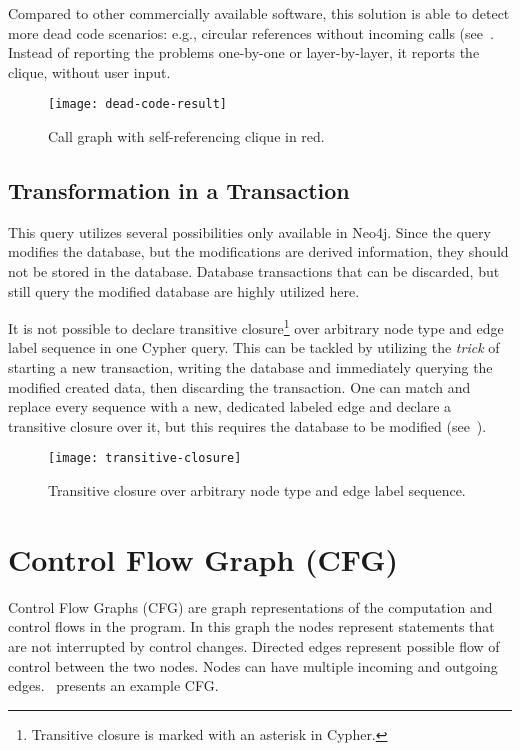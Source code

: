 Compared to other commercially available software, this solution is able to detect more dead code scenarios: e.g., circular references without incoming calls (see~. Instead of reporting the problems one-by-one or layer-by-layer, it reports the clique, without user input.

\begin{figure}[htbp]
  \centering
  \texttt{[image: dead-code-result]}
  \caption{Call graph with self-referencing clique in red.}
  \label{fig:dead-code-result}
\end{figure}

\subsection{Transformation in a Transaction}
This query utilizes several possibilities only available in Neo4j. Since the query modifies the database, but the modifications are derived information, they should not be stored in the database. Database transactions that can be discarded, but still query the modified database are highly utilized here.

It is not possible to declare transitive closure\footnote{Transitive closure is marked with an asterisk in Cypher.} over arbitrary node type and edge label sequence in one Cypher query. This can be tackled by utilizing the \emph{trick} of starting a new transaction, writing the database and immediately querying the modified created data, then discarding the transaction. One can match and replace every sequence with a new, dedicated labeled edge and declare a transitive closure over it, but this requires the database to be modified (see~).

\begin{figure}[htbp]
  \centering
  \texttt{[image: transitive-closure]}
  \caption{Transitive closure over arbitrary node type and edge label sequence.}
  \label{fig:transitive-closure}
\end{figure}


\section{Control Flow Graph (CFG)}
\label{sect:transforming-asg-to-cfg}
Control Flow Graphs (CFG) are graph representations of the computation and control flows in the program. In this graph the nodes represent statements that are not interrupted by control changes. Directed edges represent possible flow of control between the two nodes. Nodes can have multiple incoming and outgoing edges.~\cite{IntroductionToCompilers}
 presents an example CFG.

